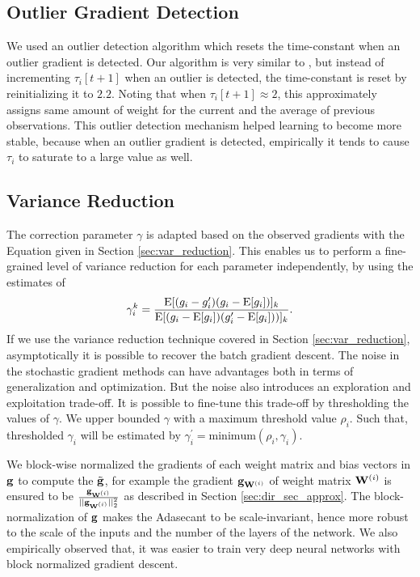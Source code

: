 \documentclass{article}
\begin{document}
\subsection{Outlier Gradient Detection}

We used an outlier detection algorithm which resets the time-constant when an outlier gradient 
is detected. Our algorithm is very similar to \cite{schaul2013adaptive}, but instead of
incrementing $\tau_i[t+1]$ when an outlier is detected, the time-constant is reset by reinitializing
it to $2.2$. Noting that when $\tau_i[t+1] \approx 2$, this approximately assigns same amount of
weight for the current and the average of previous observations.  This outlier detection mechanism helped learning to become more stable, 
because when an outlier gradient is detected, empirically it tends to cause $\tau_i$ to saturate 
to a large value as well.

\subsection{Variance Reduction}
The correction parameter $\gamma$ is adapted based on the observed gradients with the Equation given in Section
\ref{sec:var_reduction}. This enables us to perform a fine-grained level of variance reduction for each
parameter independently, by using the estimates of 
\[
  \gamma^k_i =\frac{\mathrm{E}[(g_i - g_i^{\prime})(g_i - \mathrm{E}[g_i])]_k}{\mathrm{E}[(g_i-\mathrm{E}[g_i])(g_i^{\prime}-\mathrm{E}[g_i]))]_k}.
\]
If we use the variance reduction technique covered in Section \ref{sec:var_reduction},
   asymptotically it is possible to recover the batch gradient descent. The noise in the stochastic
   gradient methods can have advantages both in terms of generalization and optimization. But the noise 
   also introduces an exploration and exploitation trade-off. It is possible to fine-tune this trade-off 
   by thresholding the values of $\gamma$. We upper bounded $\gamma$ with a maximum threshold value $\rho_i$. Such that, 
   thresholded $\gamma_i$ will be estimated by $\gamma_i^{\prime}=\text{minimum}(\rho_i, \gamma_i)$.

We block-wise normalized the gradients of each weight matrix and bias vectors in $\mathbf{g}$ to compute the
$\tilde{\mathbf{g}}$, for example the gradient $\mathbf{g}_{{\mathbf W}^{(i)}}$ of weight matrix ${\mathbf W}^{(i)}$ is ensured to be
$\frac{\mathbf{g}_{{\mathbf W}^{(i)}}}{||\mathbf{g}_{{\mathbf W}^{(i)}}||_2^2}$ as described in Section \ref{sec:dir_sec_approx}. The block-normalization of 
$\mathbf{g}$ makes the Adasecant to be scale-invariant, hence more robust to the scale of the inputs and the number of the layers of the network.
We also empirically observed that, it was easier to train very deep neural networks with block normalized gradient descent.
\end{document}
